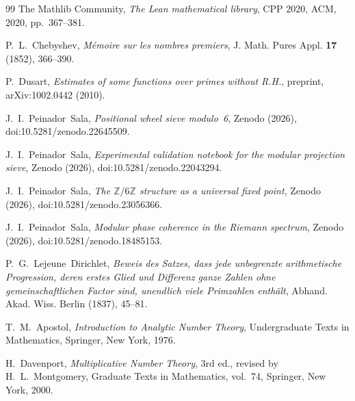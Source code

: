 \documentclass[11pt]{amsart}
\numberwithin{equation}{section}
\newcommand{\ZZ}{\mathbb{Z}}
\theoremstyle{plain}
\theoremstyle{definition}
\begin{document}
\begin{thebibliography}{99}
The Mathlib Community,
\emph{The Lean mathematical library},
CPP 2020, ACM, 2020, pp.~367--381.

P.~L.~Chebyshev,
\emph{M\'emoire sur les nombres premiers},
J. Math. Pures Appl. \textbf{17} (1852), 366--390.

P.~Dusart,
\emph{Estimates of some functions over primes without R.H.},
preprint, arXiv:1002.0442 (2010).

J.~I.~Peinador~Sala,
\emph{Positional wheel sieve modulo~6},
Zenodo (2026), doi:10.5281/zenodo.22645509.

J.~I.~Peinador~Sala,
\emph{Experimental validation notebook for the modular projection
sieve}, Zenodo (2026),
doi:10.5281/zenodo.22043294.

J.~I.~Peinador~Sala,
\emph{The $\ZZ/6\ZZ$ structure as a universal fixed point},
Zenodo (2026), doi:10.5281/zenodo.23056366.

J.~I.~Peinador~Sala,
\emph{Modular phase coherence in the Riemann spectrum},
Zenodo (2026), doi:10.5281/zenodo.18485153.

P.~G.~Lejeune~Dirichlet,
\emph{Beweis des Satzes, dass jede unbegrenzte arithmetische
Progression, deren erstes Glied und Differenz ganze Zahlen ohne
gemeinschaftlichen Factor sind, unendlich viele Primzahlen enth\"alt},
Abhand. Akad. Wiss. Berlin (1837), 45--81.

T.~M.~Apostol,
\emph{Introduction to Analytic Number Theory},
Undergraduate Texts in Mathematics, Springer, New York, 1976.

H.~Davenport,
\emph{Multiplicative Number Theory},
3rd ed., revised by H.~L.~Montgomery,
Graduate Texts in Mathematics, vol.~74, Springer, New York, 2000.

\end{thebibliography}
\end{document}
